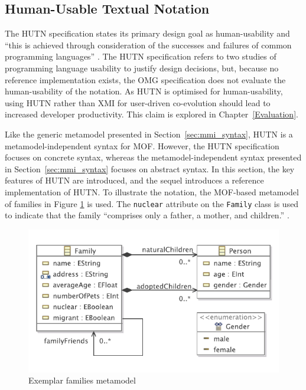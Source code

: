 \subsection{Human-Usable Textual Notation}
\label{subsec:hutn}
The HUTN specification states its primary design goal as human-usability and ``this is achieved through consideration of the successes and failures of common programming languages'' \cite[Section 2.2]{hutn}. The HUTN specification refers to two studies of programming language usability to justify design decisions, but, because no reference implementation exists, the OMG specification does not evaluate the human-usability of the notation. As HUTN is optimised for human-usability, using HUTN rather than XMI for user-driven co-evolution should lead to increased developer productivity. This claim is explored in Chapter~\ref{Evaluation}.

Like the generic metamodel presented in Section~\ref{sec:mmi_syntax}, HUTN is a metamodel-independent syntax for 
MOF. However, the HUTN specification focuses on concrete syntax, whereas the metamodel-independent syntax presented in Section~\ref{sec:mmi_syntax} focuses on abstract syntax. In this section, the key features of HUTN are introduced, and the sequel introduces a reference implementation of HUTN. To illustrate the notation, the MOF-based metamodel of families in Figure \ref{fig:example-mm} is used. The \texttt{nu\-cl\-e\-ar} attribute on the \texttt{Fa\-mi\-ly} class is used to indicate that the family ``comprises only a father, a mother, and children.'' \cite{nucleardef}.

\begin{figure}[htbp]
  \begin{center}
    \leavevmode
    \includegraphics[scale=0.85]{5.Implementation/images/families.pdf}
  \end{center}
  \caption{Exemplar families metamodel}
  \label{fig:example-mm}
\end{figure}


